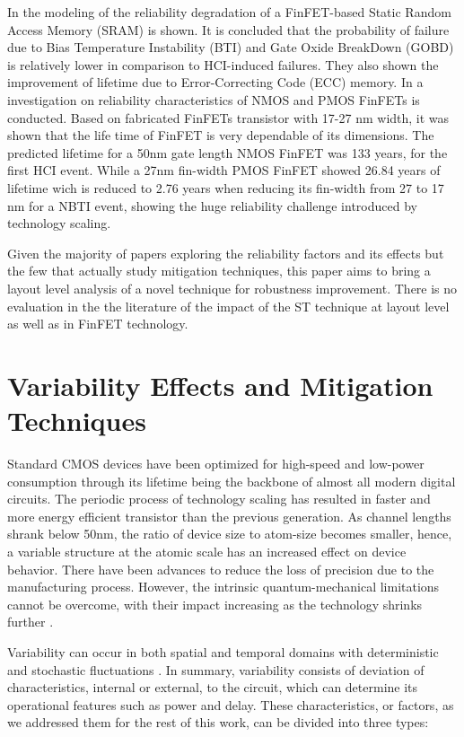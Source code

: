 \documentclass[ecp,tc, english]{iiufrgs}
\begin{document}
In \cite{FinFET04} the modeling of the reliability degradation of a FinFET-based Static Random Access Memory (SRAM) is shown. It is concluded that the probability of failure due to Bias Temperature Instability (BTI) and Gate Oxide BreakDown (GOBD) is relatively lower in comparison to HCI-induced failures. They also shown the improvement of lifetime due to Error-Correcting Code (ECC) memory. In \cite{FINFET05} a investigation on reliability characteristics of NMOS and PMOS FinFETs is conducted. Based on fabricated FinFETs transistor with 17-27 nm width, it was shown that the life time of FinFET is very dependable of its dimensions. The predicted lifetime for a 50nm gate length NMOS FinFET was 133 years, for the first HCI event. While a 27nm fin-width PMOS FinFET showed 26.84 years of lifetime wich is reduced to 2.76 years when reducing its fin-width from 27 to 17 nm for a NBTI event, showing the huge reliability challenge introduced by technology scaling.

Given the majority of papers exploring the reliability factors and its effects but the few that actually study mitigation techniques, this paper aims to bring a layout level analysis of a novel technique for robustness improvement. There is no evaluation in the the literature of the impact of the ST technique at layout level as well as in FinFET technology.

\chapter{Variability Effects and Mitigation Techniques}

Standard CMOS devices have been optimized for high-speed and low-power consumption through its lifetime being the backbone of almost all modern digital circuits. The periodic process of technology scaling has resulted in faster and more energy efficient transistor than the previous generation. As channel lengths shrank below 50nm, the ratio of device size to atom-size becomes smaller, hence, a variable structure at the atomic scale has an increased effect on device behavior. There have been advances to reduce the loss of precision due to the manufacturing process. However, the intrinsic quantum-mechanical limitations cannot be overcome, with their impact increasing as the technology shrinks further \cite{asenov1999random}. 

Variability can occur in both spatial and temporal domains with deterministic and stochastic fluctuations \cite{walker2010optimizing}. In summary, variability consists of deviation of characteristics, internal or external, to the circuit, which can determine its operational features such as power and delay. These characteristics, or factors, as we addressed them for the rest of this work, can be divided into three types: 
 
\end{document}
